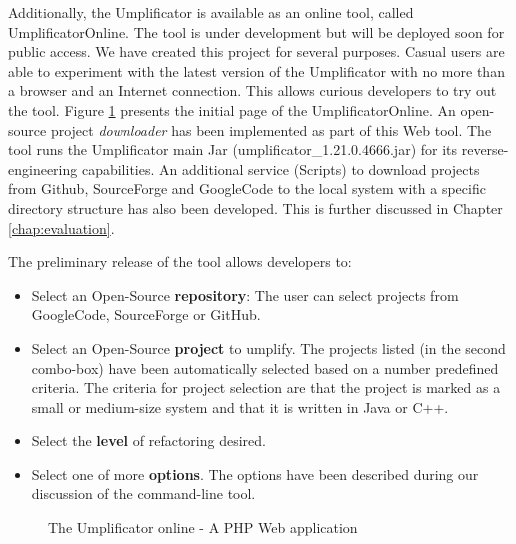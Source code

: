 Additionally, the Umplificator is available as an online tool, called UmplificatorOnline. The tool is under development but will be deployed soon for public access. We have created this project for several purposes. Casual users are able to experiment with the latest version of the Umplificator with no more than a browser and an Internet connection. This allows curious developers to try out the tool. Figure \ref{fig:umpleonline} presents the initial page of the UmplificatorOnline.
An open-source project \textit{downloader} has been implemented as part of this Web tool. The tool runs the  Umplificator main Jar (umplificator\_1.21.0.4666.jar) for its reverse-engineering capabilities. An additional service (Scripts) to download projects from Github, SourceForge and GoogleCode to the local system with a specific directory structure has also been developed. This is further discussed in Chapter \ref{chap:evaluation}.

The preliminary release of the tool allows developers to:

\begin{itemize}
\item Select an Open-Source \textbf{repository}: The user can select projects from GoogleCode, SourceForge or GitHub.
\item Select an Open-Source \textbf{project} to umplify. The projects listed (in the second combo-box) have been automatically selected based on a number predefined criteria. The criteria for project selection are that the project is marked as a small or medium-size system and that it is written in Java or C++.
\item Select the \textbf{level} of refactoring desired.
\item Select one of more \textbf{options}. The options have been described during our discussion of the command-line tool.
\end{itemize}

\begin{figure}[h]
\centering
{}
\caption{The Umplificator online - A PHP Web application}
\label{fig:umpleonline}
\end{figure}



